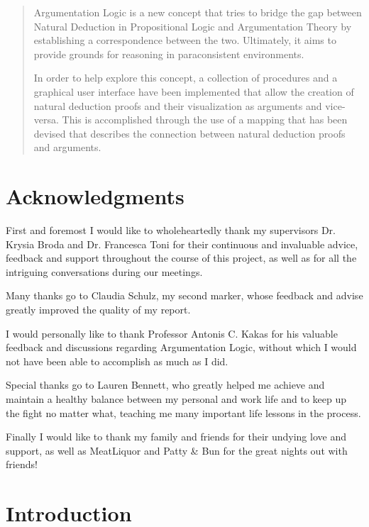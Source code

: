 \documentclass[11pt,twoside,a4paper]{report}
\begin{document}
\begin{abstract}
Argumentation Logic is a new concept that tries to bridge the gap between Natural Deduction in Propositional Logic and Argumentation Theory by establishing a correspondence between the two. Ultimately, it aims to provide grounds for reasoning in paraconsistent environments.

\noindent In order to help explore this concept, a collection of procedures and a graphical user interface have been implemented that allow the creation of natural deduction proofs and their visualization as arguments and vice-versa. This is accomplished through the use of a mapping that has been devised that describes the connection between natural deduction proofs and arguments.
\end{abstract}

\chapter*{Acknowledgments}
First and foremost I would like to wholeheartedly thank my supervisors Dr. Krysia Broda and Dr. Francesca Toni for their continuous and invaluable advice, feedback and support throughout the course of this project, as well as for all the intriguing conversations during our meetings.

\medskip
\noindent Many thanks go to Claudia Schulz, my second marker, whose feedback and advise greatly improved the quality of my report.

\medskip
\noindent I would personally like to thank Professor Antonis C. Kakas for his valuable feedback and discussions regarding Argumentation Logic, without which I would not have been able to accomplish as much as I did.

\medskip
\noindent Special thanks go to Lauren Bennett, who greatly helped me achieve and maintain a healthy balance between my personal and work life and to keep up the fight no matter what, teaching me many important life lessons in the process.

\medskip
\noindent Finally I would like to thank my family and friends for their undying love and support, as well as MeatLiquor and Patty \& Bun for the great nights out with friends!

\tableofcontents

\clearpage
\fancyhf{}
\fancyhead[RE,LO]{\small\nouppercase{\leftmark}}
\fancyhead[LE,RO]{\small\nouppercase{\rightmark}}
\fancyfoot[CE,CO]{\thepage}

\chapter{Introduction}
\end{document}
